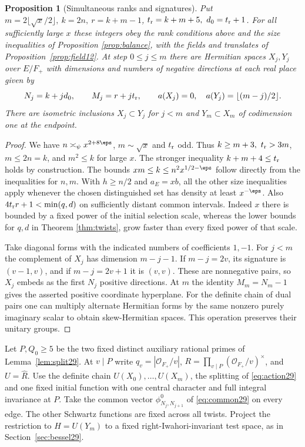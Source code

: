\documentclass[a4paper,11pt]{article}
\newtheorem{proposition}{Proposition}[section]
\theoremstyle{definition}
\theoremstyle{remark}
\numberwithin{equation}{section}
\newcommand{\OO}{\mathcal O}
\begin{document}
\begin{proposition}[Simultaneous ranks and signatures]\label{prop:ranks47}
Put \(m=2\lfloor\sqrt{x}/2\rfloor,\ k=2n,\ r=k+m-1\),
\(t_{\rm r}=k+m+5,\ d_0=t_{\rm r}+1\). For all sufficiently large \(x\)
these integers obey the rank conditions above and the size inequalities
of Proposition \ref{prop:balance}, with the fields and translates of
Proposition~\ref{prop:field12}. At step \(0\le j\le m\) there are Hermitian spaces
\(X_j,Y_j\) over \(E/F_+\) with dimensions and numbers of negative
directions at each real place given by
\[
  N_j=k+jd_0,\qquad M_j=r+jt_{\rm r},\qquad
  a(X_j)=0,\quad a(Y_j)=\lfloor(m-j)/2\rfloor .
\]
There are isometric inclusions \(X_j\subset Y_j\) for \(j<m\) and
\(Y_m\subset X_m\) of codimension one at the endpoint.
\end{proposition}
\begin{proof}
We have \(n\asymp_\psi x^{2+8\eps}\), \(m\sim\sqrt{x}\) and \(t_{\rm r}\)
odd. Thus \(k\ge m+3,\ t_{\rm r}>3m\), \(m\le2n=k\), and \(m^2\le k\)
for large \(x\). The stronger inequality \(k+m+4\le t_{\rm r}\)
holds by construction. The bounds \(xm\le k\le n^2x^{1/2-\eps}\)
follow directly from the inequalities for \(n,m\). With \(h\ge n/2\)
and \(a_E=xb\), all the other size inequalities apply whenever the
chosen distinguished set has density at least \(x^{-\eps}\).
Also \(4t_{\rm r}r+1<\min(q,d)\) on sufficiently distant common
intervals. Indeed \(x\) there is bounded by a fixed power of the
initial selection scale, whereas the lower bounds for \(q,d\) in
Theorem \ref{thm:twists}, grow faster than every fixed power of that scale.

Take diagonal forms with the indicated numbers of coefficients \(1,-1\).
For \(j<m\) the complement of \(X_j\) has dimension \(m-j-1\).
If \(m-j=2v\), its signature is \((v-1,v)\), and if \(m-j=2v+1\)
it is \((v,v)\). These are nonnegative pairs, so \(X_j\) embeds as
the first \(N_j\) positive directions. At \(m\) the identity
\(M_m=N_m-1\) gives the asserted positive coordinate hyperplane.
For the definite chain of dual pairs one can multiply alternate
Hermitian forms by the same nonzero purely imaginary scalar to obtain
skew-Hermitian spaces. This operation preserves their unitary groups.
\end{proof}

Let \(P,Q_0\ge5\) be the two fixed distinct auxiliary rational primes
of Lemma~\ref{lem:split29}. At \(v\mid P\) write \(q_v=|\OO_{F_+}/v|\),
\(R=\prod_{v\mid P}(\OO_{F_+}/v)^\times\), and \(U=\widehat R\).
Use the definite chain \(U(X_0),\ldots,U(X_m)\), the splitting of
\eqref{eq:action29} and one fixed initial function with one central
character and full integral invariance at \(P\). Take the common
vector \(\phi^0_{N_j,N_{j+1}}\) of \eqref{eq:common29} on every edge.
The other Schwartz functions are fixed across all twists. Project the
restriction to \(H=U(Y_m)\) to a fixed right-Iwahori-invariant test
space, as in Section~\ref{sec:bessel29}.
\end{document}
